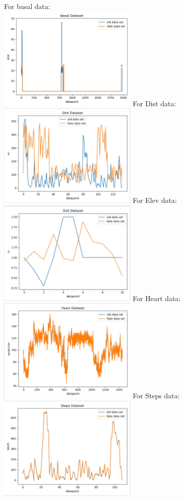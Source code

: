 \documentclass[]{book}
\begin{document}
For basal data:\\
\includegraphics[width=0.50000\textwidth]{./images/BasalData.png} For
Dist data:\\
\includegraphics[width=0.50000\textwidth]{./images/Dist Data.JPG} For
Elev data:\\
\includegraphics[width=0.50000\textwidth]{./images/Elev Data.JPG} For
Heart data:\\
\includegraphics[width=0.50000\textwidth]{./images/Heart Data.JPG} For
Steps data:\\
\includegraphics[width=0.50000\textwidth]{./images/Steps Data.JPG}
\end{document}
